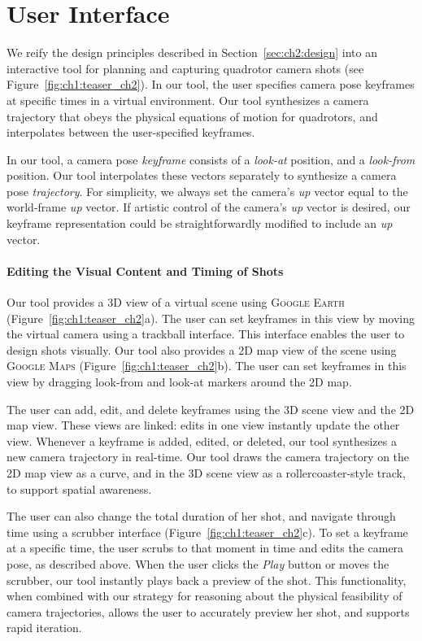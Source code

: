 \section{User Interface}
\label{sec:ch2:ui}

We reify the design principles described in Section~\ref{sec:ch2:design} into an interactive tool for planning and capturing quadrotor camera shots (see Figure~\ref{fig:ch1:teaser_ch2}).
In our tool, the user specifies camera pose keyframes at specific times in a virtual environment.
Our tool synthesizes a camera trajectory that obeys the physical equations of motion for quadrotors, and interpolates between the user-specified keyframes.

In our tool, a camera pose \emph{keyframe} consists of a \emph{look-at} position, and a \emph{look-from} position.
Our tool interpolates these vectors separately to synthesize a camera pose \emph{trajectory}.
For simplicity, we always set the camera's \emph{up} vector equal to the world-frame \emph{up} vector.
If artistic control of the camera's \emph{up} vector is desired, our keyframe representation could be straightforwardly modified to include an \emph{up} vector. 

\paragraph{Editing the Visual Content and Timing of Shots}

Our tool provides a 3D view of a virtual scene using \textsc{Google Earth} (Figure~\ref{fig:ch1:teaser_ch2}a).
The user can set keyframes in this view by moving the virtual camera using a trackball interface.
This interface enables the user to design shots visually.
Our tool also provides a 2D map view of the scene using \textsc{Google Maps} (Figure~\ref{fig:ch1:teaser_ch2}b).
The user can set keyframes in this view by dragging look-from and look-at markers around the 2D map.

The user can add, edit, and delete keyframes using the 3D scene view and the 2D map view.
These views are linked: edits in one view instantly update the other view.
Whenever a keyframe is added, edited, or deleted, our tool synthesizes a new camera trajectory in real-time.
Our tool draws the camera trajectory on the 2D map view as a curve, and in the 3D scene view as a rollercoaster-style track, to support spatial awareness.

The user can also change the total duration of her shot, and navigate through time using a scrubber interface (Figure~\ref{fig:ch1:teaser_ch2}c). To set a keyframe at a specific time, the user scrubs to that moment in time and edits the camera pose, as described above.
When the user clicks the \emph{Play} button or moves the scrubber, our tool instantly plays back a preview of the shot.
This functionality, when combined with our strategy for reasoning about the physical feasibility of camera trajectories, allows the user to accurately preview her shot, and supports rapid iteration.

